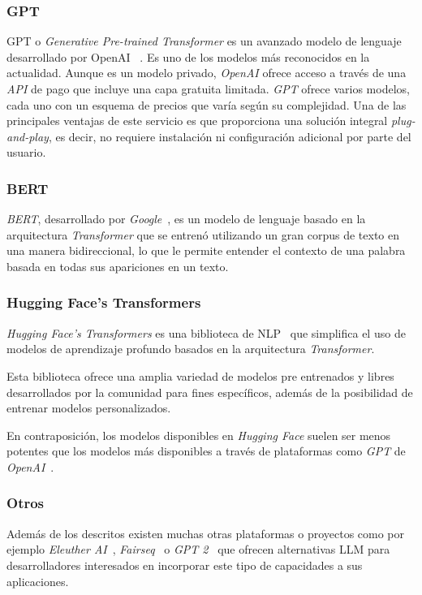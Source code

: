 \subsubsection*{GPT}
GPT o \textit{Generative Pre-trained Transformer} es un avanzado modelo de lenguaje desarrollado por OpenAI
~\cite{article_brown_2020}.
Es uno de los modelos más reconocidos en la actualidad.
Aunque es un modelo privado, \textit{OpenAI} ofrece acceso a través de una \textit{API} de pago que incluye una capa
gratuita limitada.
\textit{GPT} ofrece varios modelos, cada uno con un esquema de precios que varía según su complejidad.
Una de las principales ventajas de este servicio es que proporciona una solución integral \textit{plug-and-play}, es
decir, no requiere instalación ni configuración adicional por parte del usuario.

\subsubsection*{BERT}
\textit{BERT}, desarrollado por \textit{Google}~\cite{article_devlin_2019}, es un modelo de lenguaje basado en la
arquitectura \textit{Transformer} que se entrenó utilizando un gran corpus de texto en una manera bidireccional, lo
que le permite entender el contexto de una palabra basada en todas sus apariciones en un texto.

\subsubsection*{Hugging Face's Transformers}

\textit{Hugging Face's Transformers} es una biblioteca de NLP~\cite{article_wolf_2020} que simplifica el uso de modelos
de aprendizaje profundo basados en la arquitectura \textit{Transformer}.

Esta biblioteca ofrece una amplia variedad de modelos pre entrenados y libres desarrollados por la comunidad para fines
específicos, además de la posibilidad de entrenar modelos personalizados.

En contraposición, los modelos disponibles en \textit{Hugging Face}
suelen ser menos potentes que los modelos más disponibles a través de plataformas como \textit{GPT} de
\textit{OpenAI}~\cite{url_chatgpt_vs_huggingchat}.

\subsubsection*{Otros}

Además de los descritos existen muchas otras plataformas o proyectos como por ejemplo
\textit{Eleuther AI}~\cite{url_eleutherai}, \textit{Fairseq}~\cite{url_fairseq} o \textit{GPT 2}~\cite{url_openai_gpt2}
que ofrecen alternativas LLM para desarrolladores interesados en incorporar este tipo de capacidades a sus aplicaciones.
